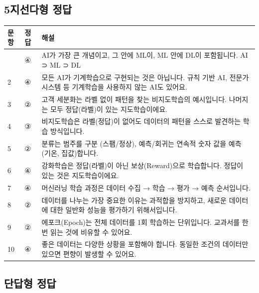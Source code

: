 \documentclass[a4paper, 11pt]{article}
\begin{document}
\hypertarget{uxc9c0uxc120uxb2e4uxd615-uxc815uxb2f5}{%
\subsection{5지선다형
정답}\label{uxc9c0uxc120uxb2e4uxd615-uxc815uxb2f5}}

\begin{longtable}{p{4.5cm}p{4.5cm}p{5.0cm}}
\toprule\noalign{}
\textbf{문항} & \textbf{정답} & \textbf{해설} \\
\midrule\noalign{}
\endhead
\bottomrule\noalign{}
\endlastfoot
1 & ④ & AI가 가장 큰 개념이고, 그 안에 ML이, ML 안에 DL이 포함됩니다. AI
⊃ ML ⊃ DL \\
2 & ④ & 모든 AI가 기계학습으로 구현되는 것은 아닙니다. 규칙 기반 AI,
전문가 시스템 등 기계학습을 사용하지 않는 AI도 있어요. \\
3 & ② & 고객 세분화는 라벨 없이 패턴을 찾는 비지도학습의 예시입니다.
나머지는 모두 정답(라벨)이 있는 지도학습이에요. \\
4 & ③ & 비지도학습은 라벨(정답)이 없어도 데이터의 패턴을 스스로 발견하는
학습 방식입니다. \\
5 & ② & 분류는 범주를 구분 (스팸/정상), 예측/회귀는 연속적 숫자 값을
예측 (기온, 집값)합니다. \\
6 & ④ & 강화학습은 정답(라벨)이 아닌 보상(Reward)으로 학습합니다. 정답이
있는 것은 지도학습이에요. \\
7 & ④ & 머신러닝 학습 과정은 데이터 수집 → 학습 → 평가 → 예측
순서입니다. \\
8 & ② & 데이터를 나누는 가장 중요한 이유는 과적합을 방지하고, 새로운
데이터에 대한 일반화 성능을 평가하기 위해서입니다. \\
9 & ② & 에포크(Epoch)는 전체 데이터를 1회 학습하는 단위입니다. 교과서를
한 번 읽는 것에 비유할 수 있어요. \\
10 & ④ & 좋은 데이터는 다양한 상황을 포함해야 합니다. 동일한 조건의
데이터만 있으면 편향이 발생할 수 있어요. \\
\end{longtable}

\hypertarget{uxb2e8uxb2f5uxd615-uxc815uxb2f5}{%
\subsection{단답형 정답}\label{uxb2e8uxb2f5uxd615-uxc815uxb2f5}}
\end{document}
